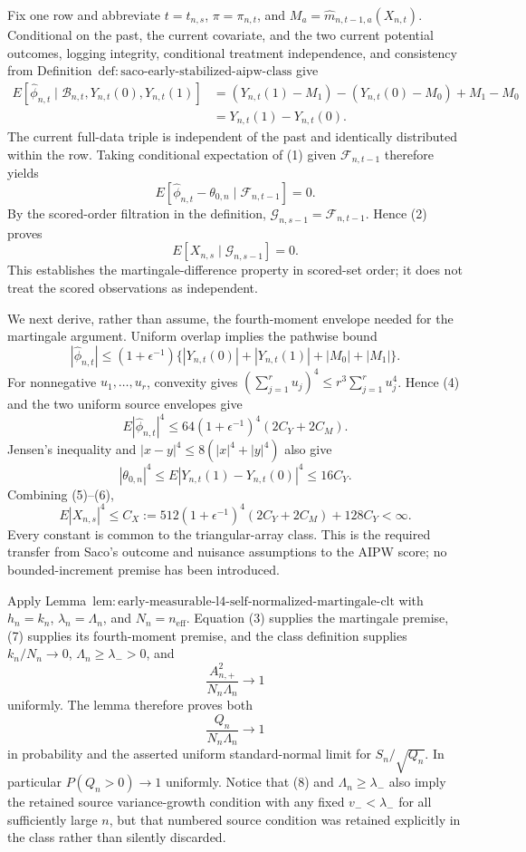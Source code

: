 Fix one row and abbreviate \(t=t_{n,s}\), \(\pi=\pi_{n,t}\), and \(M_a=\widehat m_{n,t-1,a}(X_{n,t})\).  Conditional on the past, the current covariate, and the two current potential outcomes, logging integrity, conditional treatment independence, and consistency from Definition~\(\mathrm{def:saco\text{-}early\text{-}stabilized\text{-}aipw\text{-}class}\) give
\[
\begin{aligned}
E[\widehat\phi_{n,t}\mid\mathcal B_{n,t},Y_{n,t}(0),Y_{n,t}(1)]
&=(Y_{n,t}(1)-M_1)-(Y_{n,t}(0)-M_0)+M_1-M_0\\
&=Y_{n,t}(1)-Y_{n,t}(0).
\end{aligned}
\tag{1}
\]
The current full-data triple is independent of the past and identically distributed within the row.  Taking conditional expectation of (1) given \(\mathcal F_{n,t-1}\) therefore yields
\[
E[\widehat\phi_{n,t}-\theta_{0,n}\mid\mathcal F_{n,t-1}]=0.
\tag{2}
\]
By the scored-order filtration in the definition, \(\mathcal G_{n,s-1}=\mathcal F_{n,t-1}\).  Hence (2) proves
\[
E[X_{n,s}\mid\mathcal G_{n,s-1}]=0.
\tag{3}
\]
This establishes the martingale-difference property in scored-set order; it does not treat the scored observations as independent.

We next derive, rather than assume, the fourth-moment envelope needed for the martingale argument.  Uniform overlap implies the pathwise bound
\[
|\widehat\phi_{n,t}|\le(1+\epsilon^{-1})
\{|Y_{n,t}(0)|+|Y_{n,t}(1)|+|M_0|+|M_1|\}.
\tag{4}
\]
For nonnegative \(u_1,\ldots,u_r\), convexity gives \((\sum_{j=1}^ru_j)^4\le r^3\sum_{j=1}^ru_j^4\).  Hence (4) and the two uniform source envelopes give
\[
E|\widehat\phi_{n,t}|^4
\le64(1+\epsilon^{-1})^4(2C_Y+2C_M).
\tag{5}
\]
Jensen's inequality and \(|x-y|^4\le8(|x|^4+|y|^4)\) also give
\[
|\theta_{0,n}|^4
\le E|Y_{n,t}(1)-Y_{n,t}(0)|^4\le16C_Y.
\tag{6}
\]
Combining (5)--(6),
\[
E|X_{n,s}|^4
\le C_X:=512(1+\epsilon^{-1})^4(2C_Y+2C_M)+128C_Y<\infty.
\tag{7}
\]
Every constant is common to the triangular-array class.  This is the required transfer from Saco's outcome and nuisance assumptions to the AIPW score; no bounded-increment premise has been introduced.

Apply Lemma~\(\mathrm{lem:early\text{-}measurable\text{-}l4\text{-}self\text{-}normalized\text{-}martingale\text{-}clt}\) with \(h_n=k_n\), \(\lambda_n=\Lambda_n\), and \(N_n=n_{\mathrm{eff}}\).  Equation (3) supplies the martingale premise, (7) supplies its fourth-moment premise, and the class definition supplies \(k_n/N_n\to0\), \(\Lambda_n\ge\lambda_->0\), and
\[
\frac{A_{n,+}^2}{N_n\Lambda_n}\longrightarrow1
\tag{8}
\]
uniformly.  The lemma therefore proves both
\[
\frac{Q_n}{N_n\Lambda_n}\longrightarrow1
\tag{9}
\]
in probability and the asserted uniform standard-normal limit for \(S_n/\sqrt{Q_n}\).  In particular \(P(Q_n>0)\to1\) uniformly.  Notice that (8) and \(\Lambda_n\ge\lambda_-\) also imply the retained source variance-growth condition with any fixed \(v_-<\lambda_-\) for all sufficiently large \(n\), but that numbered source condition was retained explicitly in the class rather than silently discarded.

